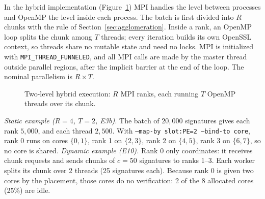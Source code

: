 \documentclass[10pt,a4paper]{article}
\begin{document}
In the hybrid implementation (Figure~\ref{fig:hybrid}) MPI handles the level between processes and OpenMP the level inside each process. The batch is first divided into $R$ chunks with the rule of Section~\ref{sec:agglomeration}. Inside a rank, an OpenMP loop splits the chunk among $T$ threads; every iteration builds its own OpenSSL context, so threads share no mutable state and need no locks. MPI is initialized with \texttt{MPI\_THREAD\_FUNNELED}, and all MPI calls are made by the master thread outside parallel regions, after the implicit barrier at the end of the loop. The nominal parallelism is $R\times T$.

\begin{figure}[t]
\centering
{}
\caption{Two-level hybrid execution: $R$ MPI ranks, each running $T$ OpenMP threads over its chunk.}
\label{fig:hybrid}
\end{figure}

\emph{Static example ($R=4$, $T=2$, E3b).} The batch of $20{,}000$ signatures gives each rank $5{,}000$, and each thread $2{,}500$. With \texttt{--map-by slot:PE=2 --bind-to core}, rank 0 runs on cores $\{0,1\}$, rank 1 on $\{2,3\}$, rank 2 on $\{4,5\}$, rank 3 on $\{6,7\}$, so no core is shared. \emph{Dynamic example (E10).} Rank 0 only coordinates: it receives chunk requests and sends chunks of $c=50$ signatures to ranks 1--3. Each worker splits its chunk over 2 threads (25 signatures each). Because rank 0 is given two cores by the placement, those cores do no verification: 2 of the 8 allocated cores (25\%) are idle.
\end{document}
